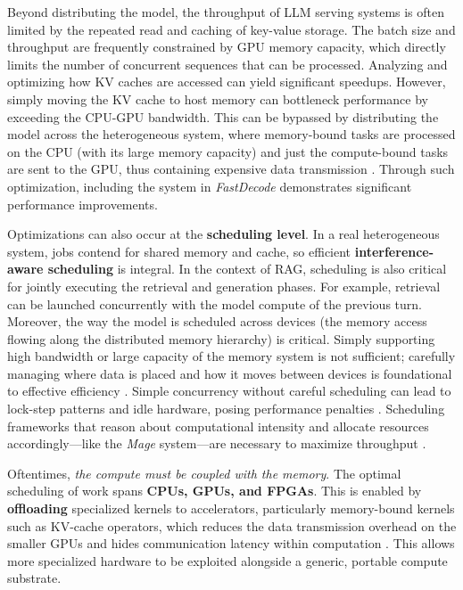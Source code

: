 \documentclass[11pt]{article}
\begin{document}
Beyond distributing the model, the throughput of LLM serving systems is often limited by the repeated read and caching of key-value storage. The batch size and throughput are frequently constrained by GPU memory capacity, which directly limits the number of concurrent sequences that can be processed. Analyzing and optimizing how KV caches are accessed can yield significant speedups. However, simply moving the KV cache to host memory can bottleneck performance by exceeding the CPU-GPU bandwidth. This can be bypassed by distributing the model across the heterogeneous system, where memory-bound tasks are processed on the CPU (with its large memory capacity) and just the compute-bound tasks are sent to the GPU, thus containing expensive data transmission \cite{ref313}. Through such optimization, including the system in \emph{FastDecode} demonstrates significant performance improvements.

Optimizations can also occur at the \textbf{scheduling level}. In a real heterogeneous system, jobs contend for shared memory and cache, so efficient \textbf{interference-aware scheduling} is integral. In the context of RAG, scheduling is also critical for jointly executing the retrieval and generation phases. For example, retrieval can be launched concurrently with the model compute of the previous turn. Moreover, the way the model is scheduled across devices (the memory access flowing along the distributed memory hierarchy) is critical. Simply supporting high bandwidth or large capacity of the memory system is not sufficient; carefully managing where data is placed and how it moves between devices is foundational to effective efficiency \cite{ref318,ref319}. Simple concurrency without careful scheduling can lead to lock-step patterns and idle hardware, posing performance penalties \cite{ref320}. Scheduling frameworks that reason about computational intensity and allocate resources accordingly---like the \emph{Mage} system---are necessary to maximize throughput \cite{ref321}.

Oftentimes, \emph{the compute must be coupled with the memory}. The optimal scheduling of work spans \textbf{CPUs, GPUs, and FPGAs}. This is enabled by \textbf{offloading} specialized kernels to accelerators, particularly memory-bound kernels such as KV-cache operators, which reduces the data transmission overhead on the smaller GPUs and hides communication latency within computation \cite{ref315,ref313}. This allows more specialized hardware to be exploited alongside a generic, portable compute substrate.
\end{document}

